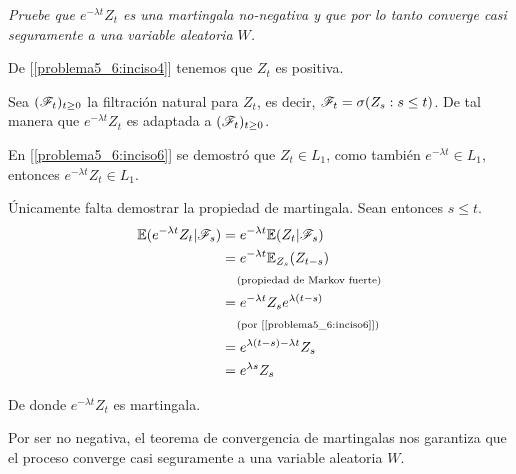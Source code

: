 \emph{
    Pruebe que $e^{-\lambda t}Z_t$ es una martingala no-negativa y que por lo tanto 
    converge casi seguramente a una variable aleatoria $W$.\pn
}

\afterstatement\pn

De [\ref{problema5_6:inciso4}] tenemos que $Z_t$ es positiva.

Sea $(\mathscr{F}_t)_{t \geq 0}$ la filtración natural para $Z_t$, es decir, $\mathscr{F}_t = \sigma(Z_s : s \leq t)$.
De tal manera que $e^{-\lambda t} Z_t$ es adaptada a $(\mathscr{F}_t)_{t \geq 0}$.\pn

En [\ref{problema5_6:inciso6}] se demostró que $Z_t \in L_1$, como también $e^{-\lambda t} \in L_1$,
entonces $e^{-\lambda t} Z_t \in L_1$.\pn

Únicamente falta demostrar la propiedad de martingala. Sean entonces $s \leq t$.
\begin{align}
        \mathbb{E}(e^{-\lambda t} Z_t | \mathscr{F}_s)   &=  e^{-\lambda t} \mathbb{E}( Z_t | \mathscr{F}_s)          \\
                                        &=  e^{-\lambda t} \mathbb{E}_{Z_s}(Z_{t-s})        \\
                                        &\;\;\;\;\mbox{{\scriptsize(propiedad de Markov fuerte)}}       \\
                                        &=  e^{-\lambda t} Z_s e^{\lambda(t-s)}     \\
                                        &\;\;\;\;\mbox{{\scriptsize(por [\ref{problema5_6:inciso6}])}}  \\
                                        &=  e^{\lambda(t-s)-\lambda t} Z_s          \\
                                        &=  e^{\lambda s} Z_s                        \\
\end{align}\pn

De donde $e^{-\lambda t} Z_t$ es martingala.\pn

Por ser no negativa, el teorema de convergencia de martingalas nos garantiza que el proceso converge casi
seguramente a una variable aleatoria $W$.